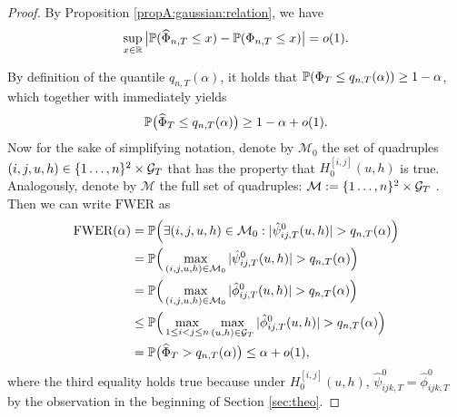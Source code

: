 \documentclass[a4paper,12pt]{article}
\makeatletter
\renewcommand{\eqref}[1]{\tagform@{\ref{#1}}}
\makeatother
\begin{document}
\begin{proof}
By Proposition \ref{propA:gaussian:relation}, we have
\begin{equation}\label{eqA:gaussian:relation}
\sup_{x \in \mathbb{R}} \big| \mathbb{P}(\widehat{\Phi}_{n, T} \le x) - \mathbb{P}(\Phi_{n,T} \le x) \big| = o(1).
\end{equation}

By definition of the quantile $q_{n, T}(\alpha)$, it holds that $\mathbb{P}(\Phi_T \le q_{n, T}(\alpha)) \ge 1-\alpha$, which together with \eqref{eqA:gaussian:relation} immediately yields
\begin{equation}\label{eq:probbound-Psihat}
\mathbb{P} \big( \widehat{\Phi}_T \le q_{n, T}(\alpha) \big) \ge 1 - \alpha + o(1).
\end{equation}
Now for the sake of simplifying notation, denote by $\mathcal{M}_0$ the set of quadruples \linebreak $(i, j, u, h) \in \{1\ldots, n\}^2 \times \mathcal{G}_T$ that has the property that $H_0^{[i, j]}(u, h)$ is true. Analogously, denote by $\mathcal{M}$ the full set of quadruples: $\mathcal{M}: = \{1\ldots, n\}^2 \times \mathcal{G}_T$ . Then we can write $\text{FWER}$ as
\begin{align*}
\text{FWER}(\alpha)
 & = \mathbb{P} \Big( \exists (i,j,u, h) \in \mathcal{M}_0: |\hat{\psi}^0_{ij,T}(u, h)| > q_{n, T}(\alpha) \Big) \\
 & = \mathbb{P} \Big( \max_{(i, j, u, h) \in \mathcal{M}_0} |\hat{\psi}^0_{ij,T}(u, h)| > q_{n, T}(\alpha) \Big) \\
 & = \mathbb{P} \Big( \max_{(i,j,u, h) \in \mathcal{M}_0} |\hat{\phi}^0_{ij,T}(u, h)| > q_{n, T}(\alpha) \Big) \\
 & \le \mathbb{P} \Big( \max_{1 \le i < j \le n} \max_{(u, h) \in \mathcal{G}_T} |\hat{\phi}_{ij,T}^0(u, h)| > q_{n, T}(\alpha) \Big) \\
 & = \mathbb{P} \big( \widehat{\Phi}_T > q_{n, T}(\alpha) \big) \le \alpha + o(1),
\end{align*}
where the third equality holds true because under $H_0^{[i, j]}(u, h)$, $\hat{\psi}^0_{ijk,T} = \hat{\phi}^0_{ijk,T}$ by the observation in the beginning of Section \ref{sec:theo}.
\end{proof}
\end{document}
